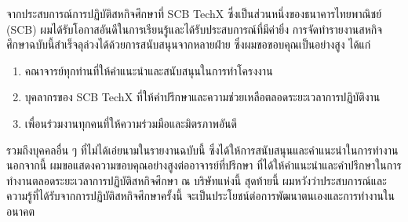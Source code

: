 \begin{acknowledgments}
    จากประสบการณ์การปฏิบัติสหกิจศึกษาที่ SCB TechX ซึ่งเป็นส่วนหนึ่งของธนาคารไทยพาณิชย์ (SCB) ผมได้รับโอกาสอันดีในการเรียนรู้และได้รับประสบการณ์ที่มีค่ายิ่ง การจัดทำรายงานสหกิจศึกษาฉบับนี้สำเร็จลุล่วงได้ด้วยการสนับสนุนจากหลายฝ่าย ซึ่งผมขอขอบคุณเป็นอย่างสูง ได้แก่
    \begin{enumerate}
        \item คณาจารย์ทุกท่านที่ให้คำแนะนำและสนับสนุนในการทำโครงงาน
        \item บุคลากรของ SCB TechX ที่ให้คำปรึกษาและความช่วยเหลือตลอดระยะเวลาการปฏิบัติงาน
        \item เพื่อนร่วมงานทุกคนที่ให้ความร่วมมือและมิตรภาพอันดี
    \end{enumerate}
    รวมถึงบุคคลอื่น ๆ ที่ไม่ได้เอ่ยนามในรายงานฉบับนี้ ซึ่งได้ให้การสนับสนุนและคำแนะนำในการทำงาน นอกจากนี้ ผมขอแสดงความขอบคุณอย่างสูงต่ออาจารย์ที่ปรึกษา ที่ได้ให้คำแนะนำและคำปรึกษาในการทำงานตลอดระยะเวลาการปฏิบัติสหกิจศึกษา ณ บริษัทแห่งนี้
    สุดท้ายนี้ ผมหวังว่าประสบการณ์และความรู้ที่ได้รับจากการปฏิบัติสหกิจศึกษาครั้งนี้ จะเป็นประโยชน์ต่อการพัฒนาตนเองและการทำงานในอนาคต
\end{acknowledgments}%
\fi %

\contentspage %

\ifproject
\figurelistpage

\fi %



